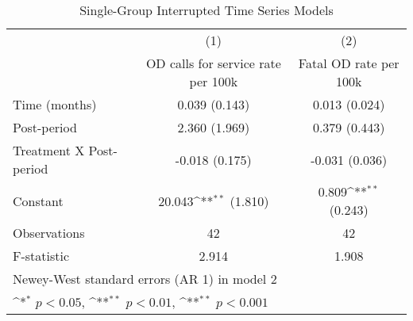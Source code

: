 \begin{table}[htbp]\centering
\def\sym#1{\ifmmode^{#1}\else\(^{#1}\)\fi}
\caption{\centering Single-Group Interrupted Time Series Models}
\begin{tabular}{l*{2}{c}}
\toprule
                &\multicolumn{1}{c}{(1)}&\multicolumn{1}{c}{(2)}\\
                &\multicolumn{1}{c}{OD calls for service rate per 100k}&\multicolumn{1}{c}{Fatal OD rate per 100k}\\
\midrule
Time (months)   &0.039 (0.143)        &0.013 (0.024)        \\
\addlinespace
Post-period     &2.360 (1.969)        &0.379 (0.443)        \\
\addlinespace
Treatment X Post-period&-0.018 (0.175)        &-0.031 (0.036)        \\
\addlinespace
Constant        &20.043\sym{**} (1.810)        &0.809\sym{**} (0.243)        \\
\midrule
Observations    &       42        &       42        \\
F-statistic     &    2.914        &    1.908        \\
\bottomrule
\multicolumn{3}{l}{\footnotesize Newey-West standard errors (AR 1) in model 2}\\
\multicolumn{3}{l}{\footnotesize \sym{*} \(p<0.05\), \sym{**} \(p<0.01\), \sym{**} \(p<0.001\)}\\
\end{tabular}
\end{table}
